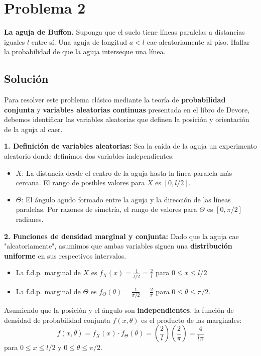 \documentclass[a4paper]{article}
\begin{document}
\section{Problema 2}
\textbf{La aguja de Buffon.} Suponga que el suelo tiene líneas paralelas a distancias iguales $l$ entre sí. Una aguja de longitud $a < l$ cae aleatoriamente al piso. Hallar la probabilidad de que la aguja interseque una línea.

\subsection{Solución}

Para resolver este problema clásico mediante la teoría de \textbf{probabilidad conjunta} y \textbf{variables aleatorias continuas} presentada en el libro de Devore, debemos identificar las variables aleatorias que definen la posición y orientación de la aguja al caer.

\textbf{1. Definición de variables aleatorias:}
Sea la caída de la aguja un experimento aleatorio donde definimos dos variables independientes:
\begin{itemize}
    \item $X$: La distancia desde el centro de la aguja hasta la línea paralela más cercana. El rango de posibles valores para $X$ es $[0, l/2]$.
    \item $\Theta$: El ángulo agudo formado entre la aguja y la dirección de las líneas paralelas. Por razones de simetría, el rango de valores para $\Theta$ es $[0, \pi/2]$ radianes.
\end{itemize}

\textbf{2. Funciones de densidad marginal y conjunta:}
Dado que la aguja cae "aleatoriamente", asumimos que ambas variables siguen una \textbf{distribución uniforme} en sus respectivos intervalos.
\begin{itemize}
    \item La f.d.p. marginal de $X$ es $f_X(x) = \frac{1}{l/2} = \frac{2}{l}$ para $0 \le x \le l/2$.
    \item La f.d.p. marginal de $\Theta$ es $f_\Theta(\theta) = \frac{1}{\pi/2} = \frac{2}{\pi}$ para $0 \le \theta \le \pi/2$.
\end{itemize}

Asumiendo que la posición y el ángulo son \textbf{independientes}, la función de densidad de probabilidad conjunta $f(x, \theta)$ es el producto de las marginales:
$$f(x, \theta) = f_X(x) \cdot f_\Theta(\theta) = \left( \frac{2}{l} \right) \left( \frac{2}{\pi} \right) = \frac{4}{l\pi}$$
para $0 \le x \le l/2$ y $0 \le \theta \le \pi/2$.
\end{document}
